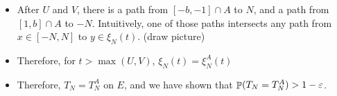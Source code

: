 \documentclass{beamer}
\newcommand{\ep}{\varepsilon}
\begin{document}
\begin{frame}
  \begin{itemize}
    \item After $U$ and $V$, there is a path from $[-b,-1] \cap A$ to $N$, and a path from $[1,b] \cap A$ to $-N$. Intuitively, one of those paths intersects any path from $x \in [-N,N]$ to $y \in \xi_{N}(t)$. (draw picture)
    \item Therefore, for $t > \max(U,V)$, $\xi_{N}(t) = \xi_{N}^{A}(t)$
    \item Therefore, $T_{N} = T_{N}^{A}$ on $E$, and we have shown that $\Prob(T_{N} = T_{N}^{A}) > 1 - \ep$.
  \end{itemize}
\end{frame}
\end{document}
